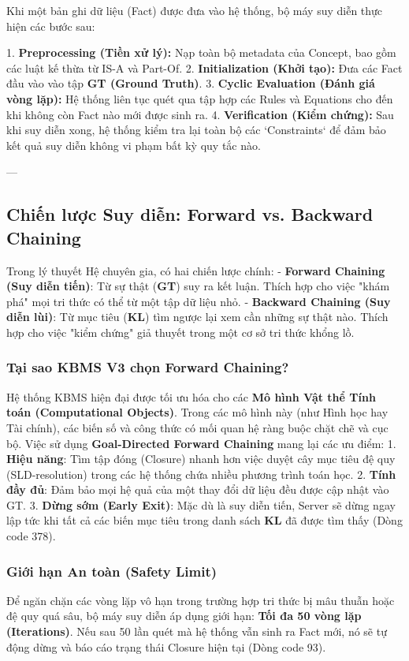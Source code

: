 Khi một bản ghi dữ liệu (Fact) được đưa vào hệ thống, bộ máy suy diễn thực hiện các bước sau:

1.  \textbf{Preprocessing (Tiền xử lý):} Nạp toàn bộ metadata của Concept, bao gồm các luật kế thừa từ IS-A và Part-Of.
2.  \textbf{Initialization (Khởi tạo):} Đưa các Fact đầu vào vào tập \textbf{GT (Ground Truth)}.
3.  \textbf{Cyclic Evaluation (Đánh giá vòng lặp):} Hệ thống liên tục quét qua tập hợp các Rules và Equations cho đến khi không còn Fact nào mới được sinh ra.
4.  \textbf{Verification (Kiểm chứng):} Sau khi suy diễn xong, hệ thống kiểm tra lại toàn bộ các `Constraints` để đảm bảo kết quả suy diễn không vi phạm bất kỳ quy tắc nào.

---

\subsection{Chiến lược Suy diễn: Forward vs. Backward Chaining}

Trong lý thuyết Hệ chuyên gia, có hai chiến lược chính:
- \textbf{Forward Chaining (Suy diễn tiến)}: Từ sự thật (\textbf{GT}) suy ra kết luận. Thích hợp cho việc "khám phá" mọi tri thức có thể từ một tập dữ liệu nhỏ.
- \textbf{Backward Chaining (Suy diễn lùi)}: Từ mục tiêu (\textbf{KL}) tìm ngược lại xem cần những sự thật nào. Thích hợp cho việc "kiểm chứng" giả thuyết trong một cơ sở tri thức khổng lồ.

\subsubsection{Tại sao KBMS V3 chọn Forward Chaining?}
Hệ thống KBMS hiện đại được tối ưu hóa cho các \textbf{Mô hình Vật thể Tính toán (Computational Objects)}. Trong các mô hình này (như Hình học hay Tài chính), các biến số và công thức có mối quan hệ ràng buộc chặt chẽ và cục bộ. Việc sử dụng \textbf{Goal-Directed Forward Chaining} mang lại các ưu điểm:
1.  \textbf{Hiệu năng}: Tìm tập đóng (Closure) nhanh hơn việc duyệt cây mục tiêu đệ quy (SLD-resolution) trong các hệ thống chứa nhiều phương trình toán học.
2.  \textbf{Tính đầy đủ}: Đảm bảo mọi hệ quả của một thay đổi dữ liệu đều được cập nhật vào GT.
3.  \textbf{Dừng sớm (Early Exit)}: Mặc dù là suy diễn tiến, Server sẽ dừng ngay lập tức khi tất cả các biến mục tiêu trong danh sách \textbf{KL} đã được tìm thấy (Dòng code 378).

\subsubsection{Giới hạn An toàn (Safety Limit)}
Để ngăn chặn các vòng lặp vô hạn trong trường hợp tri thức bị mâu thuẫn hoặc đệ quy quá sâu, bộ máy suy diễn áp dụng giới hạn: \textbf{Tối đa 50 vòng lặp (Iterations)}. Nếu sau 50 lần quét mà hệ thống vẫn sinh ra Fact mới, nó sẽ tự động dừng và báo cáo trạng thái Closure hiện tại (Dòng code 93).

